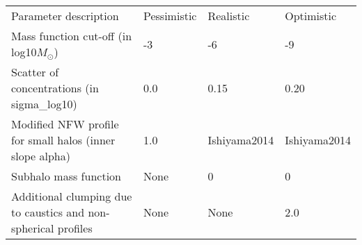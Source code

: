 \begin{table}
    \begin{tabular}{llll}
    Parameter description                                    & Pessimistic & Realistic & Optimistic \\
    Mass function cut-off (in log10$M_\odot$)        & -3 & -6 & -9 \\
    Scatter of concentrations (in sigma\_log10)              & 0.0 & 0.15 & 0.20 \\
    Modified NFW profile for small halos (inner slope alpha) & 1.0 & Ishiyama2014 & Ishiyama2014 \\
    Subhalo mass function & None & 0 & 0 \\
    Additional clumping due to caustics and non-spherical profiles & None & None & 2.0
\\    \end{tabular}
\end{table}